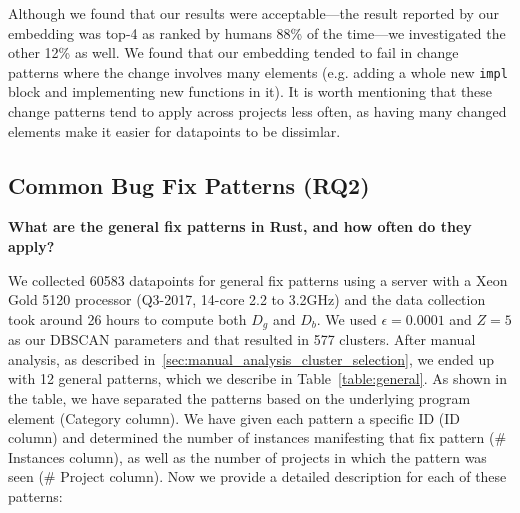 Although we found that our results were acceptable---the result reported by our embedding was top-4 as ranked by humans 88\% of the time---we investigated the other 12\% as well. We found that our embedding tended to fail in change patterns where the change involves many elements (e.g. adding a whole new \verb+impl+ block and implementing new functions in it). It is worth mentioning that these change patterns tend to apply across projects less often, as having many changed elements make it easier for datapoints to be dissimlar.

\subsection{\label{sec:common_patterns}Common Bug Fix Patterns (RQ2)}

\textbf{What are the general fix patterns in Rust, and how often do they apply?} 

We collected 60583 datapoints for general fix patterns using a server with a Xeon Gold 5120 processor (Q3-2017, 14-core 2.2 to 3.2GHz) and the data collection took around 26 hours to compute both $D_g$ and $D_b$. We used $\epsilon=0.0001$ and $Z=5$ as our DBSCAN parameters and that resulted in 577 clusters. After manual analysis, as described in~\ref{sec:manual_analysis_cluster_selection}, we ended up with 12 general patterns, which we describe in Table~\ref{table:general}. As shown in the table, we have separated the patterns based on the underlying program element (Category column). We have given each pattern a specific ID (ID column) and determined the number of instances manifesting that fix pattern (\# Instances column), as well as the number of projects in which the pattern was seen (\# Project column). Now we provide a detailed description for each of these patterns:

